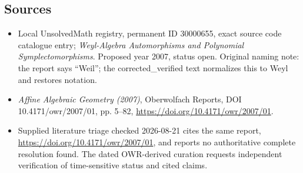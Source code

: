 \documentclass[11pt]{article}
\begin{document}
\subsection{Sources}
\begin{itemize}
\item Local UnsolvedMath registry, permanent ID 30000655, exact source code catalogue entry; \emph{Weyl-Algebra Automorphisms and Polynomial Symplectomorphisms}. Proposed year 2007, status open. Original naming note: the report says ``Weil''; the corrected\_verified text normalizes this to Weyl and restores notation.
\item \emph{Affine Algebraic Geometry (2007)}, Oberwolfach Reports, DOI 10.4171/owr/2007/01, pp. 5--82, \url{https://doi.org/10.4171/owr/2007/01}.
\item Supplied literature triage checked 2026-08-21 cites the same report, \url{https://doi.org/10.4171/owr/2007/01}, and reports no authoritative complete resolution found. The dated OWR-derived curation requests independent verification of time-sensitive status and cited claims.
\end{itemize}
\end{document}
